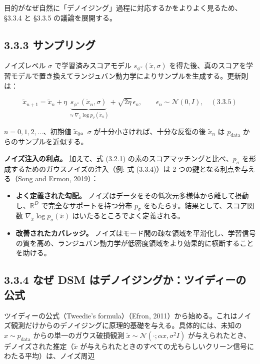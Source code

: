 目的がなぜ自然に「デノイジング」過程に対応するかをよりよく見るため、§3.3.4 と §3.3.5 の議論を展開する。

\subsection*{3.3.3 サンプリング}


ノイズレベル $\sigma$ で学習済みスコアモデル $s_{\phi^\times}(\tilde{x},\sigma)$ を得た後、真のスコアを学習モデルで置き換えてランジュバン動力学によりサンプルを生成する。更新則は：

\[
\tilde{x}_{n+1}
= \tilde{x}_n + \eta\,\underbrace{s_{\phi^\times}(\tilde{x}_n,\sigma)}_{\approx\nabla_{\tilde{x}}\log p_\sigma(\tilde{x}_n)}
+ \sqrt{2\eta}\,\epsilon_n,
\qquad\epsilon_n\sim\mathcal{N}(0,I),\quad (3.3.5)
\]


$n=0,1,2,\ldots$、初期値 $\tilde{x}_0$。$\sigma$ が十分小さければ、十分な反復の後 $\tilde{x}_n$ は $p_{\mathrm{data}}$ からのサンプルを近似する。

\textbf{ノイズ注入の利点。} 加えて、式 (3.2.1) の素のスコアマッチングと比べ、$p_\sigma$ を形成するためのガウスノイズの注入（例: 式 (3.3.4)）は 2 つの鍵となる利点を与える（Song and Ermon, 2019）：

\begin{itemize}
\item \textbf{よく定義された勾配。} ノイズはデータをその低次元多様体から離して摂動し、$\mathbb{R}^D$ で完全なサポートを持つ分布 $p_\sigma$ をもたらす。結果として、スコア関数 $\nabla_{\tilde{x}}\log p_\sigma(\tilde{x})$ はいたるところでよく定義される。
\end{itemize}


\begin{itemize}
\item \textbf{改善されたカバレッジ。} ノイズはモード間の疎な領域を平滑化し、学習信号の質を高め、ランジュバン動力学が低密度領域をより効果的に横断することを助ける。
\end{itemize}


\subsection*{3.3.4 なぜ DSM はデノイジングか：ツイディーの公式}


ツイディーの公式（Tweedie's formula）（Efron, 2011）から始める。これはノイズ観測だけからのデノイジングに原理的基礎を与える。具体的には、未知の $x\sim p_{\mathrm{data}}$ からの単一のガウス破損観測 $\tilde{x}\sim\mathcal{N}(\cdot;\alpha x,\sigma^2 I)$ が与えられたとき、デノイズされた推定（$\tilde{x}$ が与えられたときのすべての尤もらしいクリーン信号にわたる平均）は、ノイズ周辺

